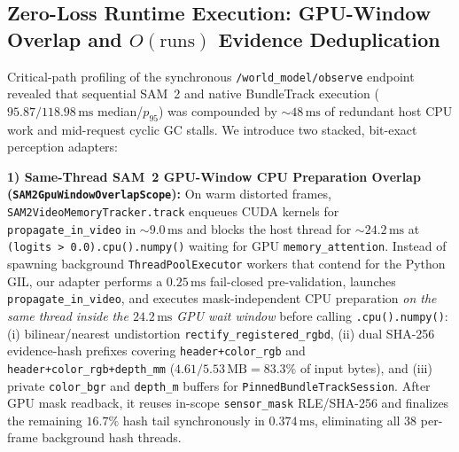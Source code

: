 \documentclass[10pt,journal]{IEEEtran}
\begin{document}
\subsection{Zero-Loss Runtime Execution: GPU-Window Overlap and $O(\text{runs})$ Evidence Deduplication}
\label{sec:runtime_opt}
Critical-path profiling of the synchronous \texttt{/world\_model/observe} endpoint revealed that sequential SAM~2 and native BundleTrack execution ($95.87/118.98\,\mathrm{ms}$ median/$p_{95}$) was compounded by $\sim 48\,\mathrm{ms}$ of redundant host CPU work and mid-request cyclic GC stalls. We introduce two stacked, bit-exact perception adapters:

\textbf{1) Same-Thread SAM~2 GPU-Window CPU Preparation Overlap (\texttt{SAM2GpuWindowOverlapScope}):} On warm distorted frames, \texttt{SAM2VideoMemoryTracker.track} enqueues CUDA kernels for \texttt{propagate\_in\_video} in $\sim 9.0\,\mathrm{ms}$ and blocks the host thread for $\sim 24.2\,\mathrm{ms}$ at \texttt{(logits > 0.0).cpu().numpy()} waiting for GPU \texttt{memory\_attention}. Instead of spawning background \texttt{ThreadPoolExecutor} workers that contend for the Python GIL, our adapter performs a $0.25\,\mathrm{ms}$ fail-closed pre-validation, launches \texttt{propagate\_in\_video}, and executes mask-independent CPU preparation \emph{on the same thread inside the $24.2\,\mathrm{ms}$ GPU wait window} before calling \texttt{.cpu().numpy()}: (i) bilinear/nearest undistortion \texttt{rectify\_registered\_rgbd}, (ii) dual SHA-256 evidence-hash prefixes covering \texttt{header+color\_rgb} and \texttt{header+color\_rgb+depth\_mm} ($4.61/5.53\,\mathrm{MB}=83.3\%$ of input bytes), and (iii) private \texttt{color\_bgr} and \texttt{depth\_m} buffers for \texttt{PinnedBundleTrackSession}. After GPU mask readback, it reuses in-scope \texttt{sensor\_mask} RLE/SHA-256 and finalizes the remaining $16.7\%$ hash tail synchronously in $0.374\,\mathrm{ms}$, eliminating all $38$ per-frame background hash threads.
\end{document}
